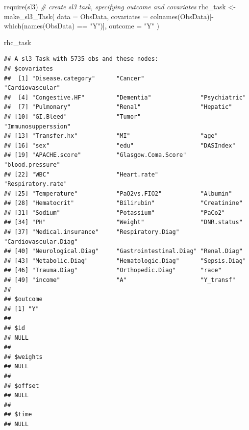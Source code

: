 \documentclass[
]{book}
\newenvironment{Shaded}{\begin{snugshade}}{\end{snugshade}}
\newcommand{\AttributeTok}[1]{\textcolor[rgb]{0.77,0.63,0.00}{#1}}
\newcommand{\CommentTok}[1]{\textcolor[rgb]{0.56,0.35,0.01}{\textit{#1}}}
\newcommand{\FunctionTok}[1]{\textcolor[rgb]{0.00,0.00,0.00}{#1}}
\newcommand{\NormalTok}[1]{#1}
\newcommand{\OtherTok}[1]{\textcolor[rgb]{0.56,0.35,0.01}{#1}}
\newcommand{\SpecialCharTok}[1]{\textcolor[rgb]{0.00,0.00,0.00}{#1}}
\newcommand{\StringTok}[1]{\textcolor[rgb]{0.31,0.60,0.02}{#1}}
\begin{document}
\begin{Shaded}
\begin{Highlighting}[]
\FunctionTok{require}\NormalTok{(sl3)}
\CommentTok{\# create sl3 task, specifying outcome and covariates }
\NormalTok{rhc\_task }\OtherTok{\textless{}{-}} \FunctionTok{make\_sl3\_Task}\NormalTok{(}
  \AttributeTok{data =}\NormalTok{ ObsData, }
  \AttributeTok{covariates =} \FunctionTok{colnames}\NormalTok{(ObsData)[}\SpecialCharTok{{-}}\FunctionTok{which}\NormalTok{(}\FunctionTok{names}\NormalTok{(ObsData) }\SpecialCharTok{==} \StringTok{"Y"}\NormalTok{)],}
  \AttributeTok{outcome =} \StringTok{"Y"}
\NormalTok{)}
\end{Highlighting}
\end{Shaded}

\begin{Shaded}
\begin{Highlighting}[]
\NormalTok{rhc\_task}
\end{Highlighting}
\end{Shaded}

\begin{verbatim}
## A sl3 Task with 5735 obs and these nodes:
## $covariates
##  [1] "Disease.category"      "Cancer"                "Cardiovascular"       
##  [4] "Congestive.HF"         "Dementia"              "Psychiatric"          
##  [7] "Pulmonary"             "Renal"                 "Hepatic"              
## [10] "GI.Bleed"              "Tumor"                 "Immunosupperssion"    
## [13] "Transfer.hx"           "MI"                    "age"                  
## [16] "sex"                   "edu"                   "DASIndex"             
## [19] "APACHE.score"          "Glasgow.Coma.Score"    "blood.pressure"       
## [22] "WBC"                   "Heart.rate"            "Respiratory.rate"     
## [25] "Temperature"           "PaO2vs.FIO2"           "Albumin"              
## [28] "Hematocrit"            "Bilirubin"             "Creatinine"           
## [31] "Sodium"                "Potassium"             "PaCo2"                
## [34] "PH"                    "Weight"                "DNR.status"           
## [37] "Medical.insurance"     "Respiratory.Diag"      "Cardiovascular.Diag"  
## [40] "Neurological.Diag"     "Gastrointestinal.Diag" "Renal.Diag"           
## [43] "Metabolic.Diag"        "Hematologic.Diag"      "Sepsis.Diag"          
## [46] "Trauma.Diag"           "Orthopedic.Diag"       "race"                 
## [49] "income"                "A"                     "Y_transf"             
## 
## $outcome
## [1] "Y"
## 
## $id
## NULL
## 
## $weights
## NULL
## 
## $offset
## NULL
## 
## $time
## NULL
\end{verbatim}
\end{document}
